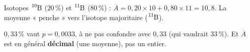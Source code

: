 \documentclass[11pt,a4paper]{article}
\begin{document}
\begin{exemplebox}
Isotopes $\ce{^{10}B}$ ($20\,\%$) et $\ce{^{11}B}$ ($80\,\%$) :
$\overline{A} = 0{,}20\times 10 + 0{,}80\times 11 = 10{,}8$. La moyenne « penche » vers l'isotope
majoritaire ($\ce{^{11}B}$).
\end{exemplebox}

\begin{piege}
$0{,}33\,\%$ vaut $p = 0{,}0033$, à ne pas confondre avec $0{,}33$ (qui vaudrait $33\,\%$). Et
$\overline{A}$ est en général \textbf{décimal} (une moyenne), pas un entier.
\end{piege}
\end{document}
